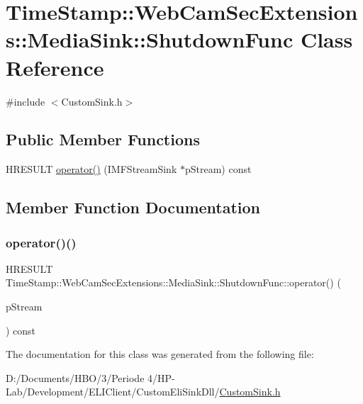 \hypertarget{class_time_stamp_1_1_web_cam_sec_extensions_1_1_media_sink_1_1_shutdown_func}{}\section{Time\+Stamp\+:\+:Web\+Cam\+Sec\+Extensions\+:\+:Media\+Sink\+:\+:Shutdown\+Func Class Reference}
\label{class_time_stamp_1_1_web_cam_sec_extensions_1_1_media_sink_1_1_shutdown_func}


{\ttfamily \#include $<$Custom\+Sink.\+h$>$}

\subsection*{Public Member Functions}
\begin{DoxyCompactItemize}
\item 
H\+R\+E\+S\+U\+LT \hyperlink{class_time_stamp_1_1_web_cam_sec_extensions_1_1_media_sink_1_1_shutdown_func_a9377bb710730450003ea5320cd2bc124}{operator()} (I\+M\+F\+Stream\+Sink $\ast$p\+Stream) const
\end{DoxyCompactItemize}


\subsection{Member Function Documentation}
\mbox{\label{class_time_stamp_1_1_web_cam_sec_extensions_1_1_media_sink_1_1_shutdown_func_a9377bb710730450003ea5320cd2bc124}} 
\subsubsection{\texorpdfstring{operator()()}{operator()()}}
{\footnotesize\ttfamily H\+R\+E\+S\+U\+LT Time\+Stamp\+::\+Web\+Cam\+Sec\+Extensions\+::\+Media\+Sink\+::\+Shutdown\+Func\+::operator() (\begin{DoxyParamCaption}\item[{I\+M\+F\+Stream\+Sink $\ast$}]{p\+Stream }\end{DoxyParamCaption}) const\hspace{0.3cm}{\ttfamily [inline]}}



The documentation for this class was generated from the following file\+:\begin{DoxyCompactItemize}
\item 
D\+:/\+Documents/\+H\+B\+O/3/\+Periode 4/\+H\+P-\/\+Lab/\+Development/\+E\+L\+I\+Client/\+Custom\+Eli\+Sink\+Dll/\hyperlink{_custom_sink_8h}{Custom\+Sink.\+h}\end{DoxyCompactItemize}
